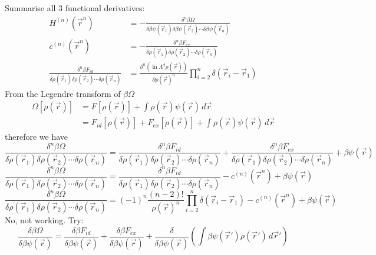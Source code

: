\documentclass[12pt]{report}
\begin{document}
Summarise all 3 functional derivatives:
\begin{align*}
  H^{(n)}(\vec{r}^n) &=
  - \frac{\delta^n \beta \Omega}{\delta \beta\psi(\vec{r}_1) \delta \beta\psi(\vec{r}_2) \cdots \delta \beta\psi(\vec{r}_n)} \\
  c^{(n)}(\vec{r}^n) &=
  - \frac{\delta^n \beta F_{ex}}{\delta \rho(\vec{r}_1)\delta \rho(\vec{r}_2) \cdots \delta \rho(\vec{r}_n)} \\
  \frac{\delta^n \beta F_{id}}{\delta \rho(\vec{r}_1) \delta \rho(\vec{r}_2) \cdots \delta \rho(\vec{r}_n)} &=
    \frac{\partial^n (\ln{\Lambda^d \rho(\vec{r})})}{\partial \rho(\vec{r})^n}
    \prod_{i=2}^n \delta(\vec{r}_i - \vec{r}_1)
\end{align*}
From the Legendre transform of $\beta \Omega$
\begin{equation}
  \begin{aligned}
    \Omega[\rho(\vec{r})] &=
    F[\rho(\vec{r})] +
    \int \rho(\vec{r}) \psi(\vec{r}) \, d\vec{r} \\
    &=
    F_{id}[\rho(\vec{r})] +
    F_{ex}[\rho(\vec{r})] +
    \int \rho(\vec{r}) \psi(\vec{r}) \, d\vec{r}
  \end{aligned}
\end{equation}
therefore we have
\begin{equation}
  \frac{\delta^n \beta \Omega}{\delta\rho(\vec{r}_1) \delta\rho(\vec{r}_2) \cdots \delta\rho(\vec{r}_n)} =
  \frac{\delta^n \beta F_{id}}{\delta \rho(\vec{r}_1) \delta \rho(\vec{r}_2) \cdots \delta \rho(\vec{r}_n)} +
  \frac{\delta^n \beta F_{ex}}{\delta \rho(\vec{r}_1)\delta \rho(\vec{r}_2) \cdots \delta \rho(\vec{r}_n)} +
  \beta \psi(\vec{r})
\end{equation}
\begin{equation}
  \frac{\delta^n \beta \Omega}{\delta\rho(\vec{r}_1) \delta\rho(\vec{r}_2) \cdots \delta\rho(\vec{r}_n)} =
  \frac{\delta^n \beta F_{id}}{\delta \rho(\vec{r}_1) \delta \rho(\vec{r}_2) \cdots \delta \rho(\vec{r}_n)} -
  c^{(n)}(\vec{r}^n) +
  \beta \psi(\vec{r})
\end{equation}
\begin{equation}
  \frac{\delta^n \beta \Omega}{\delta\rho(\vec{r}_1) \delta\rho(\vec{r}_2) \cdots \delta\rho(\vec{r}_n)} =
  (-1)^n
  \frac{(n-2)!}{\rho(\vec{r})^n}
  \prod_{i=2}^n \delta(\vec{r}_i - \vec{r}_1) -
  c^{(n)}(\vec{r}^n) +
  \beta \psi(\vec{r})
\end{equation}
No, not working. Try:
\begin{equation}
  \frac{\delta\beta \Omega}{\delta\beta\psi(\vec{r})} =
  \frac{\delta\beta F_{id}}{\delta\beta\psi(\vec{r})} +
  \frac{\delta\beta F_{ex}}{\delta\beta\psi(\vec{r})} +
  \frac{\delta}{\delta\beta\psi(\vec{r})}
  \left(
  \int \beta\psi(\vec{r}') \rho(\vec{r}') \, d\vec{r}'
  \right)
\end{equation}
\end{document}
